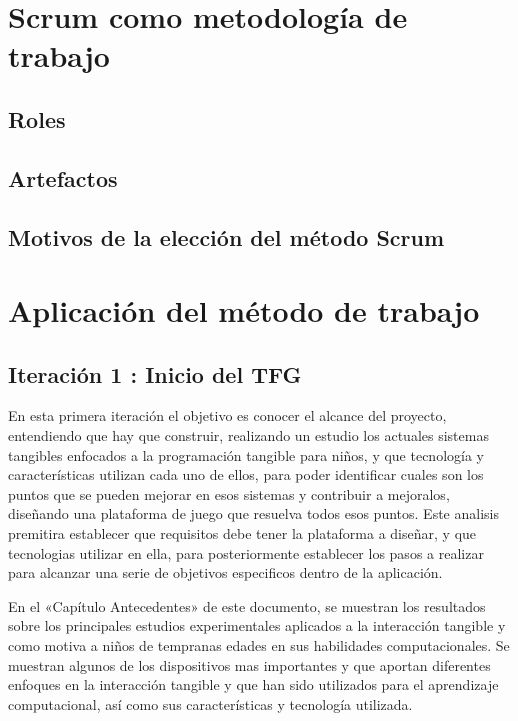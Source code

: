 \section{Scrum como metodología de trabajo}



\subsection{Roles}



\subsection{Artefactos}



\subsection{Motivos de la elección del método Scrum}



\section{Aplicación del método de trabajo}



\subsection{Iteración 1 : Inicio del TFG }
En esta primera iteración el objetivo es conocer el alcance del proyecto, entendiendo que hay que construir, realizando un estudio los actuales sistemas tangibles enfocados a la programación tangible para niños, y que tecnología y características utilizan cada uno de ellos, para poder identificar cuales son los puntos que se pueden mejorar en esos sistemas y contribuir a mejoralos, diseñando una plataforma de juego que resuelva todos esos puntos. Este analisis premitira establecer que requisitos debe tener la plataforma a diseñar, y que tecnologias utilizar en ella, para posteriormente establecer los pasos a realizar para alcanzar una serie de objetivos especificos dentro de la aplicación.

En el «Capítulo Antecedentes» de este documento, se muestran los resultados sobre los principales estudios experimentales aplicados a la interacción tangible y como motiva a niños de tempranas edades en sus habilidades computacionales. Se muestran algunos de los dispositivos mas importantes y que aportan diferentes enfoques en la interacción tangible y que han sido utilizados para el aprendizaje computacional, así como sus características y tecnología utilizada.

